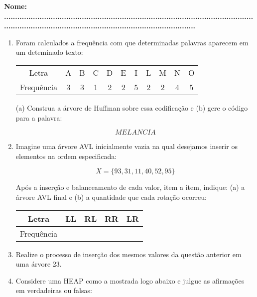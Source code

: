\documentclass[11pt]{article}
\begin{document}
\large \textbf{Nome: \tiny ......................................................................................................................................................................................................}
\begin{enumerate}[label=\textbf{Q\arabic*}]
    \item Foram calculados a frequência com que determinadas palavras aparecem em um deteminado texto:
          \begin{center}
              \begin{tabular}{c|cccccccccc}
                  \hline
                  Letra      & A & B & C & D & E & I & L & M & N & O \\
                  Frequência & 3 & 3 & 1 & 2 & 2 & 5 & 2 & 2 & 4 & 5 \\
                  \hline
              \end{tabular}
          \end{center}
          (a) Construa a árvore de Huffman sobre essa codificação e (b) gere o código para a palavra:

          $$MELANCIA$$

    \item Imagine uma árvore AVL inicialmente vazia na qual desejamos inserir os elementos na ordem especificada:\label{QAVL_1}

          $$X = \{93, 31, 11, 40, 52, 95\}$$

          Após a inserção e balanceamento de cada valor, item a item, indique: (a) a árvore AVL final e (b) a quantidade que cada rotação ocorreu:

          \begin{center}
              \begin{tabular}{|c|c|c|c|c|}
                  \hline
                  Letra      & LL & RL & RR & LR \\
                  \hline
                  Frequência & \  & \  & \  & \  \\
                  \hline
              \end{tabular}
          \end{center}

    \item Realize o processo de inserção dos mesmos valores da questão anterior em uma árvore 23.

    \item Considere uma HEAP como a mostrada logo abaixo e julgue as afirmações em verdadeiras ou falsas:


\end{enumerate}
\end{document}
